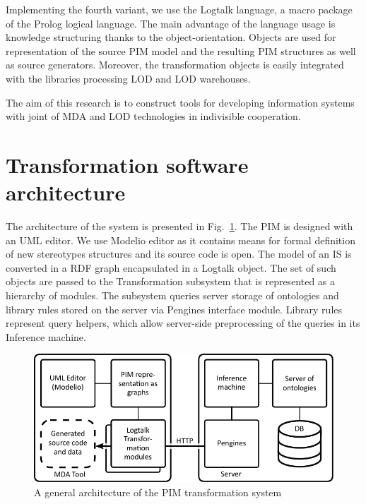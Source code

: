 \documentclass[conference,a4paper]{IEEEtran}
\begin{document}
Implementing the fourth variant, we use the Logtalk language, a macro package of the Prolog logical language.  The main advantage of the language usage is knowledge structuring thanks to the object-orientation.  Objects are used for representation of the source PIM model and the resulting PIM structures as well as source generators.  Moreover, the transformation objects is easily integrated with the libraries processing LOD and LOD warehouses.

The aim of this research is to construct tools for developing information systems with joint of MDA and LOD technologies in indivisible cooperation.


\section{Transformation software architecture}
\label{sec:arch}

The architecture of the system is presented in Fig.~\ref{fig:arch}.  The PIM is designed with an UML editor.  We use Modelio \cite{modelio} editor as it contains means for formal definition of new stereotypes structures and its source code is open.  The model of an IS is converted in a RDF graph encapsulated in a Logtalk object.  The set of such objects are passed to the Transformation subsystem that is represented as a hierarchy of modules.  The subsystem queries server storage of ontologies and library rules stored on the server via Pengines interface module.  Library rules represent query helpers, which allow server-side preprocessing of the queries in its Inference machine.

\begin{figure}[t]
  \centering
  \includegraphics[width=1\linewidth]{architecture-mda-lod-ext.pdf}
  \caption{A general architecture of the PIM transformation system}
  \label{fig:arch}
\end{figure}
\end{document}
